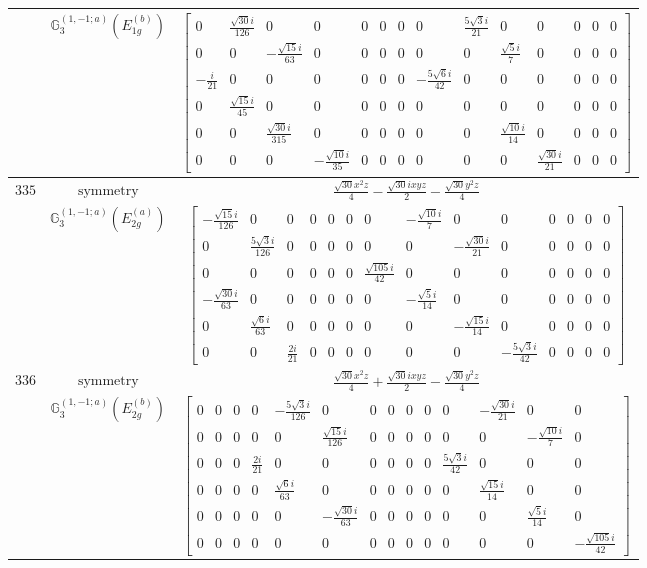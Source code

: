 \documentclass[fleqn,8pt,landscape]{jsarticle}
\begin{document}
\begin{longtable}{ccc}
$  $ & $ \mathbb{G}_{3}^{(1,-1;a)}(E_{1g}^{(b)}) $ & $ \begin{bmatrix} 0 & \frac{\sqrt{30} i}{126} & 0 & 0 & 0 & 0 & 0 & 0 & \frac{5 \sqrt{3} i}{21} & 0 & 0 & 0 & 0 & 0 \\ 0 & 0 & - \frac{\sqrt{15} i}{63} & 0 & 0 & 0 & 0 & 0 & 0 & \frac{\sqrt{5} i}{7} & 0 & 0 & 0 & 0 \\ - \frac{i}{21} & 0 & 0 & 0 & 0 & 0 & 0 & - \frac{5 \sqrt{6} i}{42} & 0 & 0 & 0 & 0 & 0 & 0 \\ 0 & \frac{\sqrt{15} i}{45} & 0 & 0 & 0 & 0 & 0 & 0 & 0 & 0 & 0 & 0 & 0 & 0 \\ 0 & 0 & \frac{\sqrt{30} i}{315} & 0 & 0 & 0 & 0 & 0 & 0 & \frac{\sqrt{10} i}{14} & 0 & 0 & 0 & 0 \\ 0 & 0 & 0 & - \frac{\sqrt{10} i}{35} & 0 & 0 & 0 & 0 & 0 & 0 & \frac{\sqrt{30} i}{21} & 0 & 0 & 0 \end{bmatrix} $ \\ \hline
$ 335 $ & $ \text{symmetry} $ & $ \frac{\sqrt{30} x^{2} z}{4} - \frac{\sqrt{30} i x y z}{2} - \frac{\sqrt{30} y^{2} z}{4} $ \\
$  $ & $ \mathbb{G}_{3}^{(1,-1;a)}(E_{2g}^{(a)}) $ & $ \begin{bmatrix} - \frac{\sqrt{15} i}{126} & 0 & 0 & 0 & 0 & 0 & 0 & - \frac{\sqrt{10} i}{7} & 0 & 0 & 0 & 0 & 0 & 0 \\ 0 & \frac{5 \sqrt{3} i}{126} & 0 & 0 & 0 & 0 & 0 & 0 & - \frac{\sqrt{30} i}{21} & 0 & 0 & 0 & 0 & 0 \\ 0 & 0 & 0 & 0 & 0 & 0 & \frac{\sqrt{105} i}{42} & 0 & 0 & 0 & 0 & 0 & 0 & 0 \\ - \frac{\sqrt{30} i}{63} & 0 & 0 & 0 & 0 & 0 & 0 & - \frac{\sqrt{5} i}{14} & 0 & 0 & 0 & 0 & 0 & 0 \\ 0 & \frac{\sqrt{6} i}{63} & 0 & 0 & 0 & 0 & 0 & 0 & - \frac{\sqrt{15} i}{14} & 0 & 0 & 0 & 0 & 0 \\ 0 & 0 & \frac{2 i}{21} & 0 & 0 & 0 & 0 & 0 & 0 & - \frac{5 \sqrt{3} i}{42} & 0 & 0 & 0 & 0 \end{bmatrix} $ \\ \hline
$ 336 $ & $ \text{symmetry} $ & $ \frac{\sqrt{30} x^{2} z}{4} + \frac{\sqrt{30} i x y z}{2} - \frac{\sqrt{30} y^{2} z}{4} $ \\
$  $ & $ \mathbb{G}_{3}^{(1,-1;a)}(E_{2g}^{(b)}) $ & $ \begin{bmatrix} 0 & 0 & 0 & 0 & - \frac{5 \sqrt{3} i}{126} & 0 & 0 & 0 & 0 & 0 & 0 & - \frac{\sqrt{30} i}{21} & 0 & 0 \\ 0 & 0 & 0 & 0 & 0 & \frac{\sqrt{15} i}{126} & 0 & 0 & 0 & 0 & 0 & 0 & - \frac{\sqrt{10} i}{7} & 0 \\ 0 & 0 & 0 & \frac{2 i}{21} & 0 & 0 & 0 & 0 & 0 & 0 & \frac{5 \sqrt{3} i}{42} & 0 & 0 & 0 \\ 0 & 0 & 0 & 0 & \frac{\sqrt{6} i}{63} & 0 & 0 & 0 & 0 & 0 & 0 & \frac{\sqrt{15} i}{14} & 0 & 0 \\ 0 & 0 & 0 & 0 & 0 & - \frac{\sqrt{30} i}{63} & 0 & 0 & 0 & 0 & 0 & 0 & \frac{\sqrt{5} i}{14} & 0 \\ 0 & 0 & 0 & 0 & 0 & 0 & 0 & 0 & 0 & 0 & 0 & 0 & 0 & - \frac{\sqrt{105} i}{42} \end{bmatrix} $ \\ \hline

\end{longtable}
\end{document}
